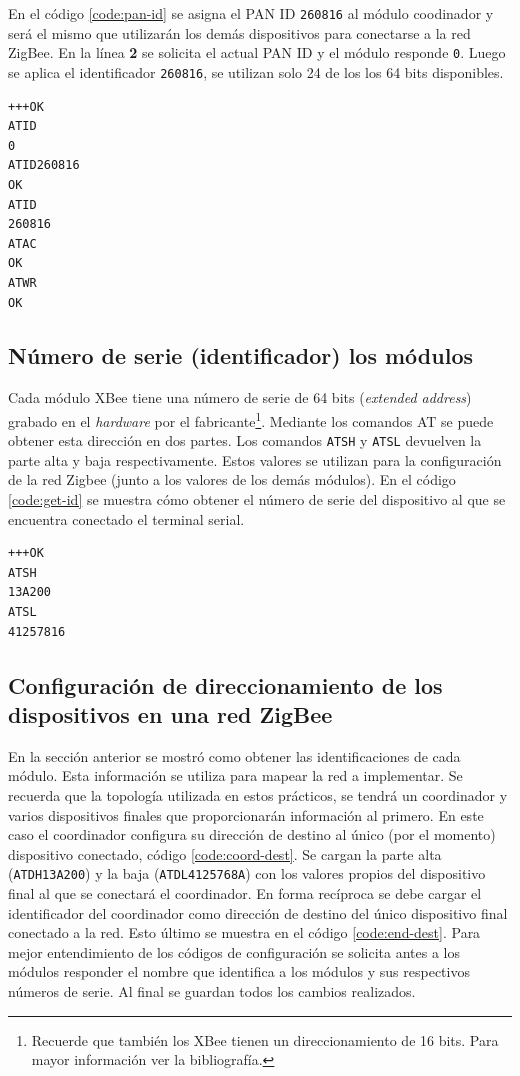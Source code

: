 \documentclass[11pt,oneside,spanish,a4paper]{article}
\begin{document}
En el código \ref{code:pan-id} se asigna el PAN ID \texttt{260816} al
módulo coodinador y será el mismo que utilizarán los demás
dispositivos para conectarse a la red ZigBee. En la línea \textbf{2}
se solicita el actual PAN ID y el módulo responde \texttt{0}. Luego se
aplica el identificador \texttt{260816}, se utilizan solo 24 de los
los 64 bits disponibles. 

\begin{lstlisting}[emph={+++,ATWR,ATAC,ATID,ATID260816},
    emphstyle={\color{blue}}, caption={Obtención del \textsl{seral
number}.}, label=code:coordinador-id]
+++OK
ATID
0
ATID260816
OK
ATID
260816
ATAC
OK
ATWR
OK
\end{lstlisting}  

\subsection{Número de serie (identificador)  los módulos}
\label{sec:id}

Cada módulo XBee tiene una número de serie de 64 bits
(\textsl{extended address}) grabado en el \textsl{hardware} por el
fabricante\footnote{Recuerde que también los XBee tienen un
  direccionamiento de 16 bits. Para mayor información ver la
  bibliografía.}. Mediante los comandos AT se puede obtener
esta dirección en dos partes. Los comandos \texttt{ATSH} y
\texttt{ATSL} devuelven la parte alta y baja respectivamente. Estos
valores se utilizan para la configuración de la red Zigbee (junto a
los valores de  los demás módulos). En
el código \ref{code:get-id}  se muestra cómo obtener el número de serie
del dispositivo al que se encuentra conectado el terminal
serial. 
\begin{lstlisting}[emph={+++,ATSH,ATSL},
    emphstyle={\color{blue}}, caption={Obtener el \textsl{serial
        number} del módulo XBee},
 label=code:get-id]
+++OK
ATSH
13A200
ATSL
41257816
\end{lstlisting}

\subsection{Configuración de direccionamiento de los dispositivos en
  una red ZigBee}

En la sección anterior se mostró como obtener las identificaciones de
cada módulo. Esta información se utiliza para mapear la red a
implementar. Se recuerda que la topología utilizada en estos
prácticos, se tendrá un coordinador y varios dispositivos finales que
proporcionarán información al primero. En este caso el coordinador
configura su dirección de destino al único (por el momento)
dispositivo conectado, código \ref{code:coord-dest}. Se cargan la
parte alta (\texttt{ATDH13A200}) y la baja (\texttt{ATDL4125768A}) con
los valores propios del dispositivo final al que se conectará el
coordinador. En forma recíproca se debe cargar el identificador del
coordinador como dirección de destino del único dispositivo final
conectado a la red. Esto último se muestra en el código
\ref{code:end-dest}. Para mejor entendimiento de los códigos de
configuración se solicita antes a los módulos responder el nombre que
identifica a los módulos y sus respectivos números de serie. Al final
se guardan todos los cambios realizados.
\end{document}
